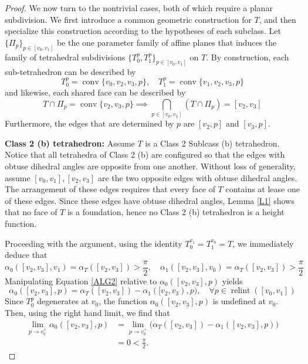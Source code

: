 \documentclass{mainresearch}
\begin{document}
\begin{proof}
	\bigskip
	
	We now turn to the nontrivial cases, both of which require a planar subdivision. We first introduce a common geometric construction for $T$, and then specialize this construction according to the hypotheses of each subclass. Let $\{\Pi_p\}_{p\in [v_0,v_1]}$ be the one parameter family of affine planes that induces the family of tetrahedral subdivisions $\{T_0^p,T_1^p\}_{p \in[v_0,v_1]}$ on $T$. By construction, each sub-tetrahedron can be described by
	\begin{equation*}
		T_0^p = \operatorname{conv}\{v_0,v_2,v_3,p\}, \quad T_1^p = \operatorname{conv}\{v_1,v_2,v_3,p\}
	\end{equation*}
	and likewise, each shared face can be described by
	\begin{equation*}
		T \cap \Pi_p = \operatorname{conv} \{v_2,v_3,p\} \implies \bigcap_{p \in [v_0,v_1]} (T\cap \Pi_p) = [v_2,v_3]
	\end{equation*}
	Furthermore, the edges that are determined by $p$ are $[v_2,p]$ and $[v_3,p]$.
	
	\bigskip
	
	
	
	\noindent\textbf{Class 2 (b) tetrahedron:} Assume $T$ is a Class 2 Sublcass (b) tetrahedron. Notice that all tetrahedra of Class 2 (b) are configured so that the edges with obtuse dihedral angles are opposite from one another. Without loss of generality, assume $[v_0,v_1], [v_2,v_3]$ are the two opposite edges with obtuse dihedral angles. The arrangement of these edges requires that every face of $T$ contains at lease one of these edges. Since these edges have obtuse dihedral angles, Lemma \ref{L1} shows that no face of $T$ is a foundation, hence no Class 2 (b) tetrahedron is a height function. 
	
	Proceeding with the argument, using the identity $T_0^{v_1}=T_1^{v_0} = T$, we immediately deduce that
	\begin{equation*}
		\alpha_0([v_2,v_3],v_1) = \alpha_T([v_2,v_3]) > \frac{\pi}{2}, \quad \alpha_1([v_2,v_3],v_0) = \alpha_T([v_2,v_3]) > \frac{\pi}{2}
	\end{equation*}
	Manipulating Equation \ref{ALG2} relative to $\alpha_0([v_2,v_3],p)$ yields
	\begin{equation*}
		\alpha_0([v_2,v_3],p) = \alpha_T([v_2,v_3])-\alpha_1([v_2,v_3),p), \quad \forall p \in \operatorname{relint}([v_0,v_1])
	\end{equation*}
	Since $T_0^p$ degenerates at $v_0$, the function $\alpha_0([v_2,v_3],p)$ is undefined at $v_0$. Then, using the right hand limit, we find that
	\begin{align*}
		\lim_{p\to v_0^+}\alpha_0([v_2,v_3],p)
		&=\lim_{p\to v_0^+}
		\bigl(\alpha_T([v_2,v_3])-\alpha_1([v_2,v_3],p)\bigr)\\
		&=0<\frac{\pi}{2}.
	\end{align*}
	

\end{proof}
\end{document}
